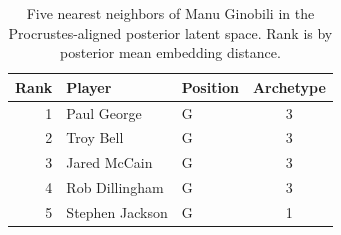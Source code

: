 \begin{table}[htbp]
  \centering\small
  \begin{tabular}{rllc}
    \toprule
    Rank & Player & Position & Archetype \\
    \midrule
    1 & Paul George & G & 3 \\
    2 & Troy Bell & G & 3 \\
    3 & Jared McCain & G & 3 \\
    4 & Rob Dillingham & G & 3 \\
    5 & Stephen Jackson & G & 1 \\
    \bottomrule
  \end{tabular}
  \caption{Five nearest neighbors of Manu Ginobili in the Procrustes-aligned posterior latent space. Rank is by posterior mean embedding distance.}
  \label{tab:Manu_Ginobili_neighbors}
\end{table}

